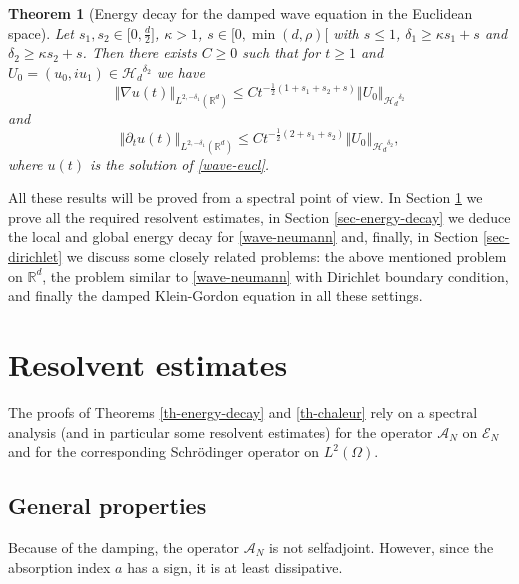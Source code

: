 \documentclass[10pt, a4paper,reqno]{amsart}
\theoremstyle{plain}
\newtheorem{theorem}{{Theorem}}[section]
\theoremstyle{definition}
\theoremstyle{remark}
\begin{document}
\begin{theorem} [Energy decay for the damped wave equation in the Euclidean space] \label{th-Rd}
Let $s_1,s_2 \in \big[0,\frac d 2]$, ${\kappa} > 1$, $s \in [0,\min(d,\rho)[$ with $s {\leqslant} 1$, ${\delta}_1 {\geqslant}  {\kappa} s_1 + s$ and ${\delta}_2 {\geqslant}  {\kappa} s_2 + s$. Then there exists $C {\geqslant} 0$ such that for $t {\geqslant} 1$ and $U_0 = (u_0,iu_1) \in {\mathcal H_d}^{{\delta}_2}$ we have 
\[
{\left\Vert {\nabla u(t)}\right\Vert}_{L^{2,-{\delta}_1}({\mathbb{R}}^d)} {\leqslant} C t^{-\frac 12 (1 + s_1 + s_2 + s)} {\left\Vert {U_0}\right\Vert}_{{\mathcal H_d}^{{\delta}_2}}
\]
and 
\[
{\left\Vert {\partial_t u(t)}\right\Vert}_{L^{2,-{\delta}_1}({\mathbb{R}}^d)} {\leqslant} C t^{-\frac 12 (2 + s_1 + s_2 )} {\left\Vert {U_0}\right\Vert}_{{\mathcal H_d}^{{\delta}_2}},
\]
where $u(t)$ is the solution of \eqref{wave-eucl}.
\end{theorem}

All these results will be proved from a spectral point of view. In Section \ref{sec-resolvent} we prove all the required resolvent estimates, in Section \ref{sec-energy-decay} we deduce the local and global energy decay for \eqref{wave-neumann} and, finally, in Section \ref{sec-dirichlet} we discuss some closely related problems: the above mentioned problem on ${\mathbb{R}}^d$, the problem similar to \eqref{wave-neumann} with Dirichlet boundary condition, and finally the damped Klein-Gordon equation in all these settings.\\

\section{Resolvent estimates} \label{sec-resolvent}

The proofs of Theorems \ref{th-energy-decay} and \ref{th-chaleur} rely on a spectral analysis (and in particular some resolvent estimates) for the operator ${{{\mathcal A}}_N}$ on ${\mathscr E_N}$ and for the corresponding Schr\"odinger operator on $L^2({\Omega})$.

\subsection{General properties}

Because of the damping, the operator ${{{\mathcal A}}_N}$ is not selfadjoint. However, since the absorption index $a$ has a sign, it is at least dissipative.
\end{document}
